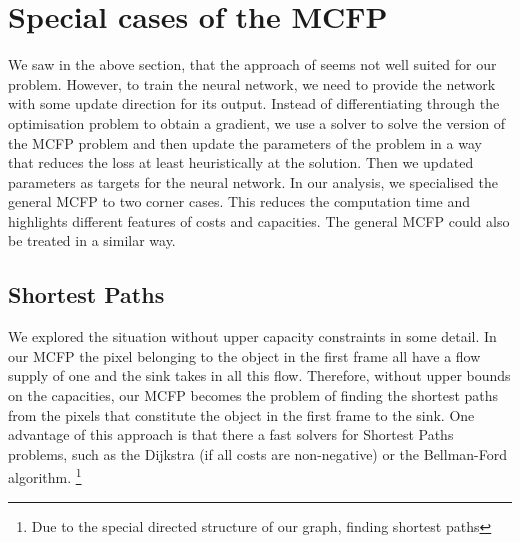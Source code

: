 \documentclass{article}
\begin{document}
\section{Special cases of the MCFP}
We saw in the above section, that the approach of \cite{AmosK17} seems not well suited for our problem. However, to train the neural network, we need to provide the network with some update direction for its output. Instead of differentiating through the optimisation problem to obtain a gradient, we use a solver to solve the version of the MCFP problem and then update the parameters of the problem in a way that reduces the loss at least heuristically at the solution. Then we updated parameters as targets for the neural network. In our analysis, we specialised the general MCFP to two corner cases. This reduces the computation time and highlights different features of costs and capacities. The general MCFP could also be treated in a similar way.


\subsection{Shortest Paths}
We explored the situation without upper capacity constraints in some detail. In our MCFP the pixel belonging to the object in the first frame all have a flow supply of one and the sink takes in all this flow. Therefore, without upper bounds on the capacities, our MCFP becomes the problem of finding the shortest paths from the pixels that constitute the object in the first frame to the sink. One advantage of this approach is that there a fast solvers for Shortest Paths problems, such as the Dijkstra (if all costs are non-negative) or the Bellman-Ford algorithm.
\footnote{Due to the special directed structure of our graph, finding shortest paths }
\end{document}
